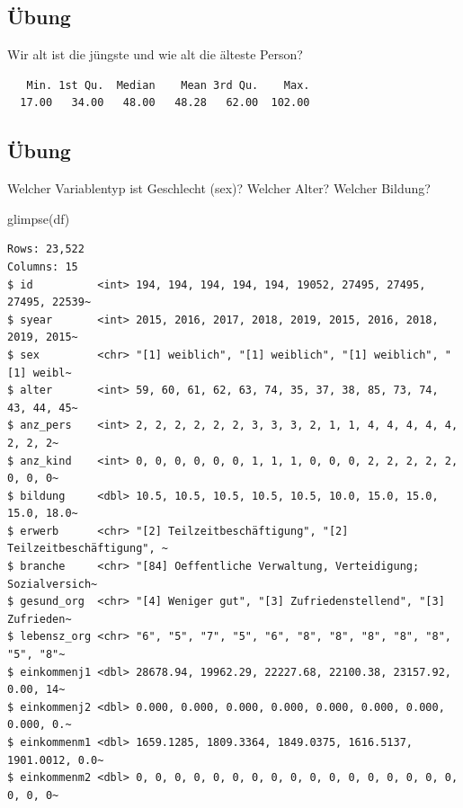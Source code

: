 \documentclass[
  letterpaper,
  DIV=11,
  numbers=noendperiod]{scrartcl}
\newenvironment{Shaded}{\begin{snugshade}}{\end{snugshade}}
\newcommand{\FunctionTok}[1]{\textcolor[rgb]{0.28,0.35,0.67}{#1}}
\newcommand{\NormalTok}[1]{\textcolor[rgb]{0.00,0.23,0.31}{#1}}
\newcommand{\SpecialCharTok}[1]{\textcolor[rgb]{0.37,0.37,0.37}{#1}}
\begin{document}
\subsection{Übung}\label{uxfcbung-2}

Wir alt ist die jüngste und wie alt die älteste Person?

\begin{Shaded}
\end{Shaded}

\begin{verbatim}
   Min. 1st Qu.  Median    Mean 3rd Qu.    Max. 
  17.00   34.00   48.00   48.28   62.00  102.00 
\end{verbatim}

\subsection{Übung}\label{uxfcbung-3}

Welcher Variablentyp ist Geschlecht (sex)? Welcher Alter? Welcher
Bildung?

\begin{Shaded}
\begin{Highlighting}[]
\FunctionTok{glimpse}\NormalTok{(df)}
\end{Highlighting}
\end{Shaded}

\begin{verbatim}
Rows: 23,522
Columns: 15
$ id          <int> 194, 194, 194, 194, 194, 19052, 27495, 27495, 27495, 22539~
$ syear       <int> 2015, 2016, 2017, 2018, 2019, 2015, 2016, 2018, 2019, 2015~
$ sex         <chr> "[1] weiblich", "[1] weiblich", "[1] weiblich", "[1] weibl~
$ alter       <int> 59, 60, 61, 62, 63, 74, 35, 37, 38, 85, 73, 74, 43, 44, 45~
$ anz_pers    <int> 2, 2, 2, 2, 2, 2, 3, 3, 3, 2, 1, 1, 4, 4, 4, 4, 4, 2, 2, 2~
$ anz_kind    <int> 0, 0, 0, 0, 0, 0, 1, 1, 1, 0, 0, 0, 2, 2, 2, 2, 2, 0, 0, 0~
$ bildung     <dbl> 10.5, 10.5, 10.5, 10.5, 10.5, 10.0, 15.0, 15.0, 15.0, 18.0~
$ erwerb      <chr> "[2] Teilzeitbeschäftigung", "[2] Teilzeitbeschäftigung", ~
$ branche     <chr> "[84] Oeffentliche Verwaltung, Verteidigung; Sozialversich~
$ gesund_org  <chr> "[4] Weniger gut", "[3] Zufriedenstellend", "[3] Zufrieden~
$ lebensz_org <chr> "6", "5", "7", "5", "6", "8", "8", "8", "8", "8", "5", "8"~
$ einkommenj1 <dbl> 28678.94, 19962.29, 22227.68, 22100.38, 23157.92, 0.00, 14~
$ einkommenj2 <dbl> 0.000, 0.000, 0.000, 0.000, 0.000, 0.000, 0.000, 0.000, 0.~
$ einkommenm1 <dbl> 1659.1285, 1809.3364, 1849.0375, 1616.5137, 1901.0012, 0.0~
$ einkommenm2 <dbl> 0, 0, 0, 0, 0, 0, 0, 0, 0, 0, 0, 0, 0, 0, 0, 0, 0, 0, 0, 0~
\end{verbatim}
\end{document}
